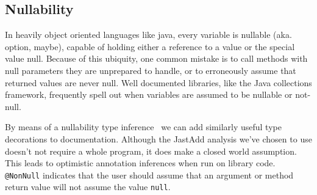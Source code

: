 \subsection{Nullability}
\label{sec:Nullability}

In heavily object oriented languages like java, every variable is nullable
(aka. option, maybe), capable of holding either a reference to a value or the
special value null.  Because of this ubiquity, one common mistake is to call
methods with null parameters they are unprepared to handle, or to erroneously
assume that returned values are never null.  Well documented libraries, like
the Java collections framework, frequently spell out when variables are
assumed to be nullable or not-null.

By means of a nullability type inference~\cite{NonNullTypeInference} we can add
similarly useful type decorations to documentation.  Although the JastAdd analysis we've chosen to use doesn't not require a whole program, it does make a closed world assumption.  This leads to optimistic annotation inferences when run on library code.  \texttt{@NonNull} indicates that the user should assume that an argument or method return value will not assume the value \texttt{null}.
